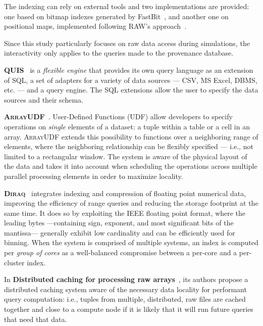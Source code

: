 The indexing can rely on external tools and two implementations are provided:
one based on bitmap indexes generated by FastBit~\cite{Wu2009},
and another one on positional maps, implemented following \textsc{RAW}'s 
approach~\cite{Karpathiotakis2014}.

Since this study particularly focuses on raw data access during simulations, the 
interactivity only applies to the queries made to the provenance database.

\medskip

\textbf{\textsc{QUIS}}~\cite{chamanara_quis_2017} is a \emph{flexible engine} that
provides its own query language as an extension of SQL, a set of adapters for a variety of
data sources --- \gls{CSV}, MS Excel, \gls{DBMS}, etc. --- and a query engine. The SQL
extensions allow the user to specify the data sources and their schema.

\medskip

\textbf{\textsc{ArrayUDF}}~\cite{dong_arrayudf_2017}. User-Defined Functions (UDF)
allow developers to specify operations on \emph{single} elements of a dataset: a tuple within
a table or a cell in an array. \textsc{ArrayUDF} extends this possibility to functions over
a neighboring range of elements, where the neighboring relationship can be flexibly specified
--- i.e., not limited to a rectangular window. The system is aware of the physical layout of the data
and takes it into account when scheduling the operations across multiple parallel processing elements
in order to maximize locality.

\medskip

\textbf{\textsc{Diraq}}~\cite{lakshminarasimhan_scalable_2018} integrates indexing and compression of floating
point numerical data, improving the efficiency of range queries and reducing the storage footprint
at the same time. It does so by exploiting the IEEE floating point format, where the leading bytes
---containing sign, exponent, and most significant bits of the mantissa--- generally exhibit low
cardinality and can be efficiently used for binning. When the system is comprised of multiple systems,
an index is computed per \emph{group of cores} as a well-balanced compromise between a per-core and a
per-cluster index.

\medskip

In \textbf{Distributed caching for processing raw arrays}~\cite{zhao_distributed_2018}, its
authors propose a distributed caching system aware of the necessary data locality for performant
query computation: i.e., tuples from multiple, distributed, raw files are cached together and close
to a compute node if it is likely that it will run future queries that need that data.

